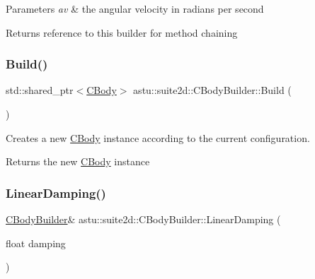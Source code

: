 \begin{DoxyParams}{Parameters}
{\em av} & the angular velocity in radians per second \\
\hline
\end{DoxyParams}
\begin{DoxyReturn}{Returns}
reference to this builder for method chaining 
\end{DoxyReturn}
\mbox{\label{classastu_1_1suite2d_1_1CBodyBuilder_a2a08001660aaa09c683a6b66d7f1a47d}} 
\subsubsection{\texorpdfstring{Build()}{Build()}}
{\footnotesize\ttfamily std\+::shared\+\_\+ptr$<$\hyperlink{classastu_1_1suite2d_1_1CBody}{C\+Body}$>$ astu\+::suite2d\+::\+C\+Body\+Builder\+::\+Build (\begin{DoxyParamCaption}{ }\end{DoxyParamCaption})}

Creates a new \hyperlink{classastu_1_1suite2d_1_1CBody}{C\+Body} instance according to the current configuration.

\begin{DoxyReturn}{Returns}
the new \hyperlink{classastu_1_1suite2d_1_1CBody}{C\+Body} instance 
\end{DoxyReturn}
\mbox{\label{classastu_1_1suite2d_1_1CBodyBuilder_af8bac26e1270985e9da41aa7f6eff9a7}} 
\subsubsection{\texorpdfstring{Linear\+Damping()}{LinearDamping()}}
{\footnotesize\ttfamily \hyperlink{classastu_1_1suite2d_1_1CBodyBuilder}{C\+Body\+Builder}\& astu\+::suite2d\+::\+C\+Body\+Builder\+::\+Linear\+Damping (\begin{DoxyParamCaption}\item[{float}]{damping }\end{DoxyParamCaption})\hspace{0.3cm}{\ttfamily [inline]}}

